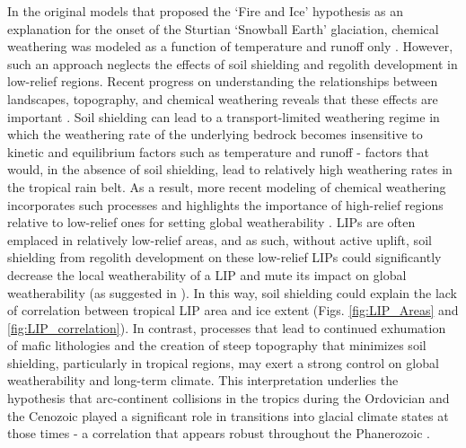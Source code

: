 \documentclass[11pt,letterpaper]{article}
\begin{document}
In the original models that proposed the `Fire and Ice' hypothesis as an explanation for the onset of the Sturtian `Snowball Earth' glaciation, chemical weathering was modeled as a function of temperature and runoff only \citep{Donnadieu2004a}. However, such an approach neglects the effects of soil shielding and regolith development in low-relief regions. Recent progress on understanding the relationships between landscapes, topography, and chemical weathering reveals that these effects are important \citep{Gabet2009a, Hartmann2014a, Maher2014a, Godderis2017b}. Soil shielding can lead to a transport-limited weathering regime in which the weathering rate of the underlying bedrock becomes insensitive to kinetic and equilibrium factors such as temperature and runoff - factors that would, in the absence of soil shielding, lead to relatively high weathering rates in the tropical rain belt. As a result, more recent modeling of chemical weathering incorporates such processes and highlights the importance of high-relief regions relative to low-relief ones for setting global weatherability \citep{West2012a, Godderis2017b}. LIPs are often emplaced in relatively low-relief areas, and as such, without active uplift, soil shielding from regolith development on these low-relief LIPs could significantly decrease the local weatherability of a LIP and mute its impact on global weatherability (as suggested in \citealp{Kent2013a}). In this way, soil shielding could explain the lack of correlation between tropical LIP area and ice extent (Figs. \ref{fig:LIP_Areas} and \ref{fig:LIP_correlation}). In contrast, processes that lead to continued exhumation of mafic lithologies and the creation of steep topography that minimizes soil shielding, particularly in tropical regions, may exert a strong control on global weatherability and long-term climate. This interpretation underlies the hypothesis that arc-continent collisions in the tropics during the Ordovician \citep{Swanson-Hysell2017a} and the Cenozoic \citep{Jagoutz2016a} played a significant role in transitions into glacial climate states at those times - a correlation that appears robust throughout the Phanerozoic \citep{Macdonald2019a}.
\end{document}
